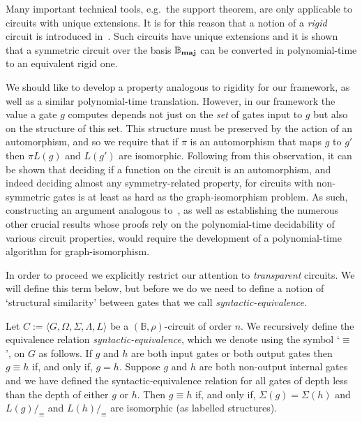 \documentclass[a4paper,UKenglish]{lipics-v2018}
\begin{document}
Many important technical tools, e.g.\ the support theorem, are only applicable
to circuits with unique extensions. It is for this reason that a notion of a
\emph{rigid} circuit is introduced in~\cite{AndersonD17}. Such circuits have
unique extensions and it is shown that a symmetric circuit over the basis $\mathbb{B}_{\text{\textbf{maj}}}$
can be converted in polynomial-time to an equivalent rigid one.

We should like to develop a property analogous to rigidity for our framework, as
well as a similar polynomial-time translation. However, in our framework the
value a gate $g$ computes depends not just on the \emph{set} of gates input to
$g$ but also on the structure of this set. This structure must be preserved by
the action of an automorphism, and so we require that if $\pi$ is an
automorphism that maps $g$ to $g'$ then $\pi L(g)$ and $L(g')$ are isomorphic.
Following from this observation, it can be shown that deciding if a function on
the circuit is an automorphism, and indeed deciding almost any symmetry-related
property, for circuits with non-symmetric gates is at least as hard as the
graph-isomorphism problem. As such, constructing an argument analogous
to~\cite{AndersonD17}, as well as establishing the numerous other crucial
results whose proofs rely on the polynomial-time decidability of various circuit
properties, would require the development of a polynomial-time algorithm for
graph-isomorphism.

In order to proceed we explicitly restrict our attention to \emph{transparent}
circuits. We will define this term below, but before we do we need to define a
notion of `structural similarity' between gates that we call
\emph{syntactic-equivalence}.

\begin{definition}
  Let $C := \langle G, \Omega, \Sigma, \Lambda, L \rangle$ be a $(\mathbb{B},
  \rho)$-circuit of order $n$. We recursively define the equivalence relation
  \emph{syntactic-equivalence}, which we denote using the symbol `$\equiv$', on
  $G$ as follows. If $g$ and $h$ are both input gates or both output gates then
  $g \equiv h$ if, and only if, $g = h$. Suppose $g$ and $h$ are both non-output
  internal gates and we have defined the syntactic-equivalence relation for all
  gates of depth less than the depth of either $g$ or $h$. Then $g \equiv h$ if,
  and only if, $\Sigma(g) = \Sigma (h)$ and $L(g) /_\equiv$ and $L(h) /_\equiv$
  are isomorphic (as labelled structures).
\end{definition}
\end{document}

